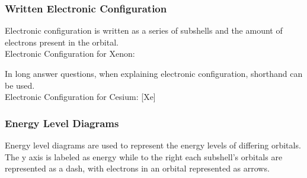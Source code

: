 \documentclass[../main]{subfiles}
\begin{document}
	\subsubsection{Written Electronic Configuration}

	Electronic configuration is written as a series of subshells and the amount of electrons present in the orbital. \\

	Electronic Configuration for Xenon:           

	In long answer questions, when explaining electronic configuration, shorthand can be used. \\

	Electronic Configuration for Cesium: [Xe]  \\

	\subsubsection{Energy Level Diagrams}

	Energy level diagrams are used to represent the energy levels of differing orbitals. The y axis is labeled as energy while to the right each subshell's orbitals are represented as a dash, with electrons in an orbital represented as arrows. 
\end{document}

